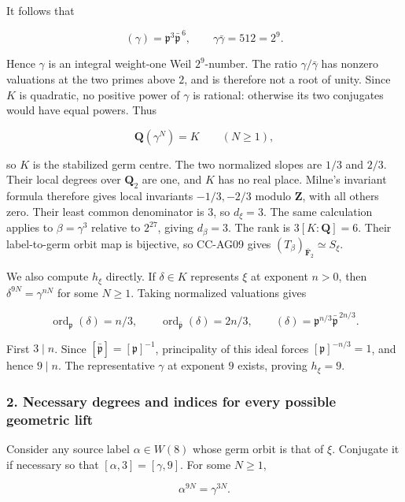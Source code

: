 It follows that

\[
 (\gamma)=\mathfrak p^3\bar{\mathfrak p}^{\,6},
 \qquad \gamma\bar\gamma=512=2^9.
 \tag{CC-AG.103}
\]

Hence \(\gamma\) is an integral weight-one Weil \(2^9\)-number. The
ratio \(\gamma/\bar\gamma\) has nonzero valuations at the two primes
above \(2\), and is therefore not a root of unity. Since \(K\) is
quadratic, no positive power of \(\gamma\) is rational: otherwise its
two conjugates would have equal powers. Thus

\[
 \mathbf Q(\gamma^N)=K\qquad(N\ge1),
 \tag{CC-AG.104}
\]

so \(K\) is the stabilized germ centre. The two normalized slopes are
\(1/3\) and \(2/3\). Their local degrees over \(\mathbf Q_2\) are one,
and \(K\) has no real place. Milne's invariant formula therefore gives
local invariants \(-1/3,-2/3\) modulo \(\mathbf Z\), with all others
zero. Their least common denominator is \(3\), so \(d_\xi=3\). The same
calculation applies to \(\beta=\gamma^3\) relative to \(2^{27}\), giving
\(d_\beta=3\). The rank is \(3[K:\mathbf Q]=6\). Their label-to-germ
orbit map is bijective, so CC-AG09 gives
\((T_\beta)_{\bar{\mathbf F}_2}\simeq S_\xi\).

We also compute \(h_\xi\) directly. If \(\delta\in K\) represents
\(\xi\) at exponent \(n>0\), then \(\delta^{9N}=\gamma^{nN}\) for some
\(N\ge1\). Taking normalized valuations gives

\[
 \operatorname{ord}_{\mathfrak p}(\delta)=n/3,\qquad
 \operatorname{ord}_{\bar{\mathfrak p}}(\delta)=2n/3,
 \qquad
 (\delta)=\mathfrak p^{n/3}\bar{\mathfrak p}^{\,2n/3}.
 \tag{CC-AG.105}
\]

First \(3\mid n\). Since \([\bar{\mathfrak p}]=[\mathfrak p]^{-1}\),
principality of this ideal forces \([\mathfrak p]^{-n/3}=1\), and hence
\(9\mid n\). The representative \(\gamma\) at exponent \(9\) exists,
proving \(h_\xi=9\).

\subsubsection{2. Necessary degrees and indices for every possible
geometric
lift}\label{necessary-degrees-and-indices-for-every-possible-geometric-lift}

Consider any source label \(\alpha\in W(8)\) whose germ orbit is that of
\(\xi\). Conjugate it if necessary so that \([\alpha,3]=[\gamma,9]\).
For some \(N\ge1\),

\[
 \alpha^{9N}=\gamma^{3N}.
 \tag{CC-AG.106}
\]

